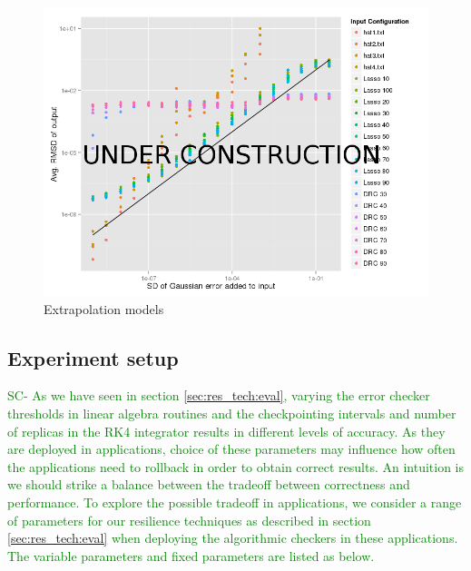 \documentclass{sig-alternate}
\newcommand{\sui}[1]{%
  \textcolor{green}{SC-#1}
}
\begin{document}
{\begin{figure}[ht!]
\centering
\includegraphics[width=1.00\columnwidth]{figs/InputVarianceOutputRMSD.png}
\caption{Extrapolation models}
\label{fig:inputvarianceoutputrmsd}
\end{figure}

\subsection{Experiment setup}
\label{sec:eval:confs}

\sui{
As we have seen in section \ref{sec:res_tech:eval}, varying the error checker thresholds in linear algebra routines and the checkpointing intervals and number of
replicas in the RK4 integrator results in different levels of accuracy. As they are deployed in applications, choice of these parameters may influence how often
the applications need to rollback in order to obtain correct results. An intuition is we should strike a balance between the tradeoff between correctness
and performance. To explore the possible tradeoff in applications, we consider a range of parameters for our resilience techniques as described in section \ref{sec:res_tech:eval} when deploying the algorithmic checkers in these applications. The variable parameters and fixed parameters are listed as below.
}

}
\end{document}

